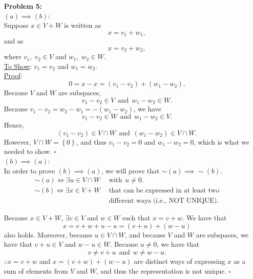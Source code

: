 \documentclass[letterpaper]{article}
\begin{document}
\noindent \textbf{Problem 5:}
\medskip \\
$(a) \implies (b)$:\\
Suppose $x\in V+W$ is written as
$$x=v_1+w_1,$$
and as
$$x=v_2+w_2,$$
where $v_1, \; v_2 \in V$ and $w_1, \; w_2 \in W$.\\
\underline{To Show}: $v_1=v_2$ and $w_1=w_2$.
\medskip \\
\underline{Proof}:
$$0=x-x=(v_1-v_2)+(w_1-w_2).$$
Because $V$ and $W$ are subspaces,
$$v_1-v_2\in V~~ \text{and}~~ w_1-w_2\in W .$$
Because $v_1-v_2=w_2-w_1=-(w_1-w_2)$, we have
$$v_1-v_2\in W~~\text{and}~~ w_1-w_2\in V.$$
Hence,
$$(v_1-v_2)\in V \cap W ~~\text{and}~~ (w_1-w_2)\in V\cap W.$$
However, $V\cap W=\left\lbrace 0 \right\rbrace$, and thus $v_1-v_2=0$ and $w_1-w_2=0$, which is what we needed to show. \hfill $\square$
\bigskip \\
$(b) \implies (a)$:\\
In order to prove $(b)\implies (a)$, we will prove that $\sim(a)\implies \sim(b).$
$$\begin{aligned}\sim(a)\Leftrightarrow \exists u\in V \cap W~~ &\text{with}~~ u \neq 0. \\
\sim(b)\Leftrightarrow \exists x\in V+W ~~ &\text{that can be expressed in at least two}\\& \text{different ways (i.e., NOT UNIQUE)} .\end{aligned} $$

Because $x\in V+W$, $\exists v\in V$ and $w\in W$ such that $x=v+w$. We have that
$$x=v+w+u-u=(v+u)+(w-u)$$
also holds. Moreover, because $u\in V\cap W$, and because $V$ and $W$ are subspaces, we have that $v+u\in V$ and $w-u\in W$. Because $u\neq 0$, we have that
$$v\neq v+u~~ \text{and}~~ w\neq w-u.$$
$\therefore x=v+w$ and $x=(v+w)+(w-u)$ are distinct ways of expressing $x$ as a sum of elements from $V$ and $W$, and thus the representation is not unique. \hfill $\square$
\bigskip \\
\end{document}
